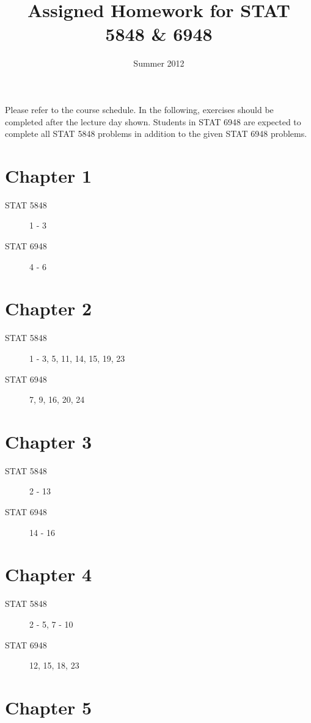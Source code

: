 \documentclass[11pt]{article}
\title{\vspace{-0.5in}Assigned Homework for STAT 5848 \& 6948}
\date{\vspace{-0.5in}Summer 2012}
\begin{document}
\maketitle


Please refer to the course schedule.  In the following, exercises should be completed after the lecture day shown.  Students in STAT 6948 are expected to complete all STAT 5848 problems in addition to the given STAT 6948 problems.

\section{Chapter 1}
\label{sec-1}

\begin{description}
\item[STAT 5848] 1 - 3
\item[STAT 6948] 4 - 6
\end{description}
\section{Chapter 2}
\label{sec-2}

\begin{description}
\item[STAT 5848] 1 - 3, 5, 11, 14, 15, 19, 23
\item[STAT 6948] 7, 9, 16, 20, 24
\end{description}
\section{Chapter 3}
\label{sec-3}

\begin{description}
\item[STAT 5848] 2 - 13
\item[STAT 6948] 14 - 16
\end{description}
\section{Chapter 4}
\label{sec-4}

\begin{description}
\item[STAT 5848] 2 - 5, 7 - 10
\item[STAT 6948] 12, 15, 18, 23
\end{description}
\section{Chapter 5}
\label{sec-5}
\end{document}
